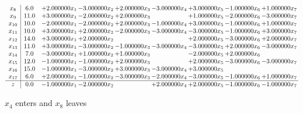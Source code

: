 \documentclass[10pt]{article}
\begin{document}
\[\begin{array}{c| c c@{\hskip 2pt} c@{\hskip 2pt} c@{\hskip 2pt} c@{\hskip 2pt} c@{\hskip 2pt} c@{\hskip 2pt} c@{\hskip 2pt} }
 x_{8}   &  6.0 & + 2.000000 x_{1} & -3.000000 x_{2} & + 2.000000 x_{3} & -3.000000 x_{4} & + 3.000000 x_{5} & -1.000000 x_{6} & + 1.000000 x_{7}\\
 x_{9}   &  11.0 & + 3.000000 x_{1} & -2.000000 x_{2} & + 2.000000 x_{3} &   & + 1.000000 x_{5} & -2.000000 x_{6} & -3.000000 x_{7}\\
 x_{10}   &  10.0 & -2.000000 x_{1} & -2.000000 x_{2} & + 2.000000 x_{3} & -1.000000 x_{4} & + 3.000000 x_{5} & -1.000000 x_{6} & + 1.000000 x_{7}\\
 x_{11}   &  10.0 & + 3.000000 x_{1} & + 2.000000 x_{2} & -2.000000 x_{3} & -3.000000 x_{4} & -3.000000 x_{5} & -1.000000 x_{6} & + 3.000000 x_{7}\\
 x_{12}   &  14.0 & + 3.000000 x_{1} & + 2.000000 x_{2} &    &   & + 2.000000 x_{5} & -3.000000 x_{6} & + 2.000000 x_{7}\\
 x_{13}   &  11.0 & + 3.000000 x_{1} & -3.000000 x_{2} & -1.000000 x_{3} & -3.000000 x_{4} & -3.000000 x_{5} & + 2.000000 x_{6} & -3.000000 x_{7}\\
 x_{14}   &  7.0 & -3.000000 x_{1} & + 1.000000 x_{2} & + 1.000000 x_{3} &   & -2.000000 x_{5} & + 2.000000 x_{6} &   \\
 x_{15}   &  12.0 & -1.000000 x_{1} & -1.000000 x_{2} & + 2.000000 x_{3} &   & + 2.000000 x_{5} & -3.000000 x_{6} & -3.000000 x_{7}\\
 x_{16}   &  15.0 & -1.000000 x_{1} & -3.000000 x_{2} & + 3.000000 x_{3} & -3.000000 x_{4} & + 3.000000 x_{5} &    &   \\
 x_{17}   &  6.0 & + 2.000000 x_{1} & -1.000000 x_{2} & -3.000000 x_{3} & -2.000000 x_{4} & -3.000000 x_{5} & -1.000000 x_{6} & + 1.000000 x_{7}\\
\hline
z    &  0.0 & -1.000000 x_{1} & -2.000000 x_{2} &   & + 2.000000 x_{4} & + 2.000000 x_{5} & -1.000000 x_{6} & -1.000000 x_{7}\\
\end{array}\]


 $ x_{4} $ enters and $ x_{8} $ leaves 
\end{document}
